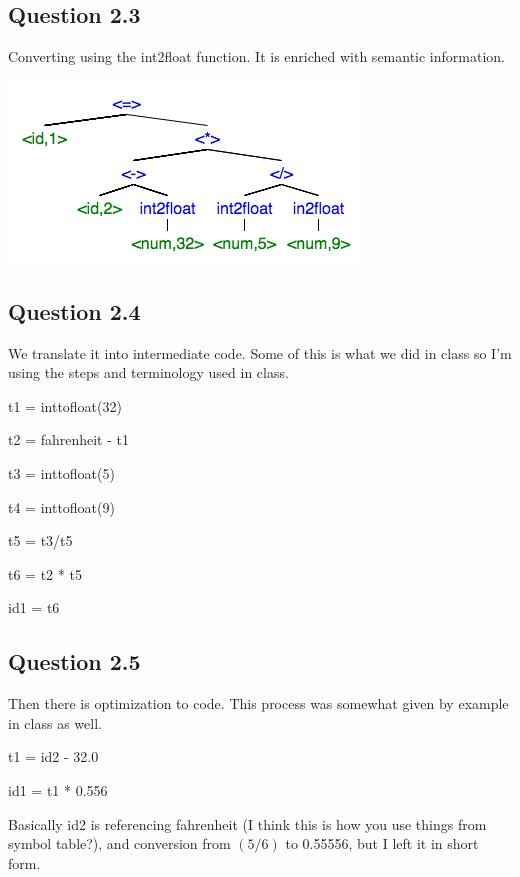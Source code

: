 \documentclass[11pt, oneside]{article}
\begin{document}
\newpage

\subsection{Question 2.3}
\par Converting using the int2float function. It is enriched with semantic information.

\includegraphics[]{image2.png}

\subsection{Question 2.4}
\par We translate it into intermediate code. Some of this is what we did in class so I'm using the steps and terminology used in class.
\par t1 = inttofloat(32)
\par t2 = fahrenheit - t1
\par t3 = inttofloat(5)
\par t4 = inttofloat(9)
\par t5 = t3/t5
\par t6 = t2 * t5
\par id1 = t6

\subsection{Question 2.5}
\par Then there is optimization to code. This process was somewhat given by example in class as well.
\par t1 = id2 - 32.0 \par id1 = t1 *  0.556
\par Basically id2 is referencing fahrenheit (I think this is how you use things from symbol table?), and conversion from $(5/6)$ to 0.55556, but I left it in short form.

\newpage
\end{document}
